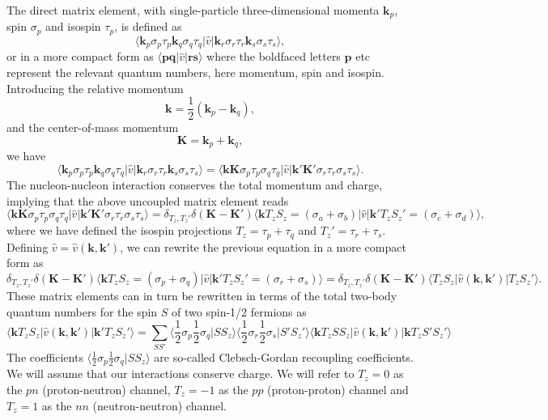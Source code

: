 \documentclass[thesis.tex]{subfiles}
\begin{document}
The direct matrix element, with single-particle three-dimensional
momenta $\mathbf{k}_p$, spin $\sigma_p$ and isospin $\tau_p$, is
defined as
\[
\langle \mathbf{k}_p\sigma_p\tau_p \mathbf{k}_q\sigma_q\tau_q \vert
\hat{v}\vert \mathbf{k}_r\sigma_r\tau_r \mathbf{k}_s\sigma_s\tau_s
\rangle,
\]
or in a more compact form as $\langle \mathbf{p}\mathbf{q}\vert
\hat{v} \vert \mathbf{r}\mathbf{s} \rangle$ where the boldfaced
letters $\mathbf{p}$ etc represent the relevant quantum numbers, here
momentum, spin and isospin. Introducing the relative momentum
\[
\mathbf{k} = \frac{1}{2}\left(\mathbf{k}_p-\mathbf{k}_q\right),
\]
and the center-of-mass momentum
\[
\mathbf{K} = \mathbf{k}_p+\mathbf{k}_q,
\]
we have
\[
\langle \mathbf{k}_p\sigma_p\tau_p \mathbf{k}_q\sigma_q\tau_q \vert
\hat{v}\vert \mathbf{k}_r\sigma_r\tau_r \mathbf{k}_s\sigma_s\tau_s
\rangle=\langle \mathbf{k}\mathbf{K}\sigma_p\tau_p \sigma_q\tau_q
\vert \hat{v}\vert \mathbf{k}'\mathbf{K}'\sigma_r\tau_r \sigma_s\tau_s
\rangle.
\]
The nucleon-nucleon interaction conserves the total momentum and
charge, implying that the above uncoupled matrix element reads
\[
\langle \mathbf{k}\mathbf{K}\sigma_p\tau_p \sigma_q\tau_q \vert
\hat{v}\vert \mathbf{k}'\mathbf{K}'\sigma_r\tau_r \sigma_s\tau_s
\rangle=\delta_{T_z,T_z'}\delta(\mathbf{K}-\mathbf{K}')\langle
\mathbf{k}T_zS_z=(\sigma_a+\sigma_b) \vert \hat{v}\vert
\mathbf{k}'T_zS_z'=(\sigma_c+\sigma_d) \rangle,
\]
where we have defined the isospin projections $T_z=\tau_p+\tau_q$ and
$T_z'=\tau_r+\tau_s$.  Defining
$\hat{v}=\hat{v}(\mathbf{k},\mathbf{k}' )$, we can rewrite the
previous equation in a more compact form as
\[
\delta_{T_z,T_z'}\delta(\mathbf{K}-\mathbf{K}')\langle
\mathbf{k}T_zS_z=(\sigma_p+\sigma_q) \vert \hat{v}\vert
\mathbf{k}'T_zS_z'=(\sigma_r+\sigma_s)
\rangle=\delta_{T_z,T_z'}\delta(\mathbf{K}-\mathbf{K}')\langle
T_zS_z\vert\hat{v}(\mathbf{k},\mathbf{k}' ) \vert T_zS_z' \rangle.
\]
These matrix elements can in turn be rewritten in terms of the total
two-body quantum numbers for the spin $S$ of two spin-1/2 fermions as
\[
\langle \mathbf{k}T_zS_z \vert \hat{v}(\mathbf{k},\mathbf{k}' )\vert
\mathbf{k}'T_zS_z' \rangle=\sum_{SS'}\langle
\frac{1}{2}\sigma_p\frac{1}{2}\sigma_q\vert SS_z\rangle \langle
\frac{1}{2}\sigma_r\frac{1}{2}\sigma_s\vert S'S_z'\rangle \langle
\mathbf{k}T_zSS_z\vert \hat{v}(\mathbf{k},\mathbf{k}' )\vert
\mathbf{k}T_zS'S_z' \rangle
\]
The coefficients $\langle \frac{1}{2}\sigma_p\frac{1}{2}\sigma_q\vert
SS_z\rangle$ are so-called Clebsch-Gordan recoupling coefficients.  We
will assume that our interactions conserve charge. We will refer to $T_z=0$ as the $pn$ (proton-neutron)
channel, $T_z=-1$ as the $pp$ (proton-proton) channel and $T_z=1$ as
the $nn$ (neutron-neutron) channel.
\end{document}
